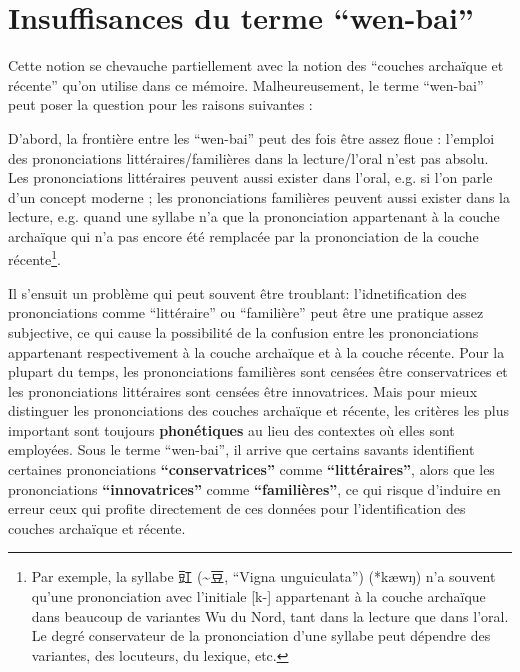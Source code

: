 \documentclass{scrbook}
\newcounter{c}[subsubsection]
\newcommand{\bolang}{\textasciitilde}
\newcommand{\difwenbai}{couches archaïque et récente\xspace}
\begin{document}
\begin{sloppypar}
\section{Insuffisances du terme ``wen-bai''}\label{cntn_wenbai}
Cette notion se chevauche partiellement avec la notion des ``\difwenbai'' qu'on utilise dans ce mémoire. Malheureusement, le terme ``wen-bai'' peut poser la question pour les raisons suivantes :

D'abord, la frontière entre les ``wen-bai'' peut des fois être assez floue :  l'emploi des prononciations littéraires/familières dans la lecture/l'oral n'est pas absolu. %
Les prononciations littéraires peuvent aussi exister dans l'oral, e.g. si l'on parle d'un concept moderne ; les prononciations familières peuvent aussi exister dans la lecture, e.g. quand une syllabe n'a que la prononciation appartenant à la couche archaïque qui n'a pas encore été remplacée par la prononciation de la couche récente\footnote{Par exemple, la syllabe 豇 (\bolang 豆, ``Vigna unguiculata'') (*kæwŋ) n'a souvent qu'une prononciation avec l'initiale [k-] appartenant à la couche archaïque dans beaucoup de variantes Wu du Nord, tant dans la lecture que dans l'oral. Le degré conservateur de la prononciation d'une syllabe peut dépendre des variantes, des locuteurs, du lexique, etc.}.

Il s'ensuit un problème qui peut souvent être troublant: l'idnetification des prononciations comme ``littéraire'' ou ``familière'' peut être une pratique assez subjective, ce qui cause la possibilité de la confusion entre les prononciations appartenant respectivement à la couche archaïque et à la couche récente. Pour la plupart du temps, les prononciations familières sont censées être conservatrices et les prononciations littéraires sont censées être innovatrices. Mais pour mieux distinguer les prononciations des \difwenbai, les critères les plus important sont toujours \textbf{phonétiques} au lieu des contextes où elles sont employées. Sous le terme ``wen-bai'', il arrive que certains savants identifient certaines prononciations \textbf{``conservatrices''} comme \textbf{``littéraires''}, alors que les prononciations \textbf{``innovatrices''} comme \textbf{``familières''}, ce qui risque d'induire en erreur ceux qui profite directement de ces données pour l'identification des \difwenbai. 


\end{sloppypar}
\end{document}

